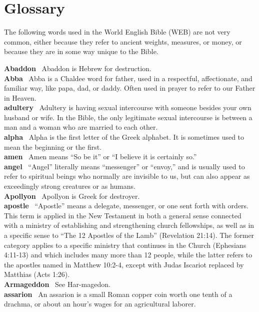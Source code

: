 \hypertarget{glossary}{%
\section{Glossary}\label{glossary}}

The following words used in the World English Bible (WEB) are not very
common, either because they refer to ancient weights, measures, or
money, or because they are in some way unique to the Bible.

\textbf{Abaddon}~ Abaddon is Hebrew for destruction.\\
\textbf{Abba}~ Abba is a Chaldee word for father, used in a respectful,
affectionate, and familiar way, like papa, dad, or daddy. Often used in
prayer to refer to our Father in Heaven.\\
\textbf{adultery}~ Adultery is having sexual intercourse with someone
besides your own husband or wife. In the Bible, the only legitimate
sexual intercourse is between a man and a woman who are married to each
other.\\
\textbf{alpha}~ Alpha is the first letter of the Greek alphabet. It is
sometimes used to mean the beginning or the first.\\
\textbf{amen}~ Amen means ``So be it'' or ``I believe it is certainly
so.''\\
\textbf{angel}~ ``Angel'' literally means ``messenger'' or ``envoy,''
and is usually used to refer to spiritual beings who normally are
invisible to us, but can also appear as exceedingly strong creatures or
as humans.\\
\textbf{Apollyon}~ Apollyon is Greek for destroyer.\\
\textbf{apostle}~ ``Apostle'' means a delegate, messenger, or one sent
forth with orders. This term is applied in the New Testament in both a
general sense connected with a ministry of establishing and
strengthening church fellowships, as well as in a specific sense to
``The 12 Apostles of the Lamb'' (Revelation 21:14). The former category
applies to a specific ministry that continues in the Church (Ephesians
4:11-13) and which includes many more than 12 people, while the latter
refers to the apostles named in Matthew 10:2-4, except with Judas
Iscariot replaced by Matthias (Acts 1:26).\\
\textbf{Armageddon}~ See Har-magedon.\\
\textbf{assarion}~ An assarion is a small Roman copper coin worth one
tenth of a drachma, or about an hour's wages for an agricultural
laborer.\\
